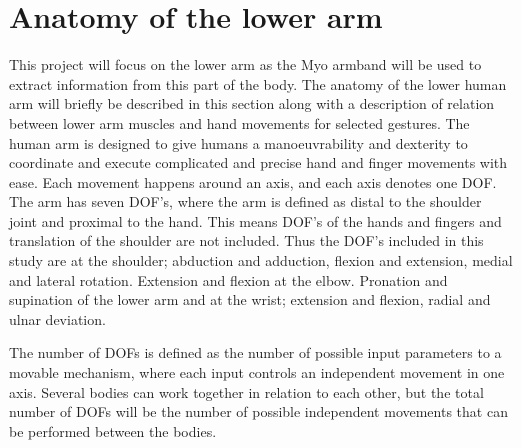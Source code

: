 \section{Anatomy of the lower arm}


This project will focus on the lower arm as the Myo armband will be used to extract information from this part of the body. The anatomy of the lower human arm will briefly be described in this section along with a description of relation between lower arm muscles and hand movements for selected gestures.
The human arm is designed to give humans a manoeuvrability and dexterity to coordinate and execute complicated and precise hand and finger movements with ease. Each movement happens around an axis, and each axis denotes one DOF. The arm has seven DOF's, where the arm is defined as distal to the shoulder joint and proximal to the hand. This means DOF's of the hands and fingers and translation of the shoulder are not included. Thus the DOF's included in this study are at the shoulder; abduction and adduction, flexion and extension, medial and lateral rotation. Extension and flexion at the elbow. Pronation and supination of the lower arm and at the wrist; extension and flexion, radial and ulnar deviation. 

%

The number of DOFs is defined as the number of possible input parameters to a movable mechanism, where each input controls an independent movement in one axis. Several bodies can work together in relation to each other, but the total number of DOFs will be the number of possible independent movements that can be performed between the bodies. \cite{dicker2003}

